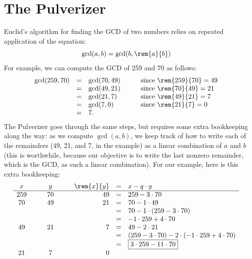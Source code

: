 \documentclass[handout]{mcs}
\begin{document}
\section{The Pulverizer}
Euclid's algorithm for finding the GCD of two numbers relies on
repeated application of the equation: 
\[
\gcd(a, b) = \gcd(b, \rem{a}{b})
\]
For example, we can compute the GCD of 259 and 70 as follows:
\[
\begin{array}{rclcl}
\gcd(259, 70)
    & = & \gcd(70, 49) & \quad & \text{since $\rem{259}{70} = 49$}\\
    & = & \gcd(49, 21) && \text{since $\rem{70}{49} = 21$} \\
    & = & \gcd(21, 7) && \text{since $\rem{49}{21} = 7$} \\
    & = & \gcd(7, 0) && \text{since $\rem{21}{7} = 0$} \\
    & = & 7.
\end{array}
\]
The Pulverizer goes through the same steps, but requires some extra
bookkeeping along the way: as we compute $\gcd(a, b)$, we keep track
of how to write each of the remainders (49, 21, and 7, in the example)
as a linear combination of $a$ and $b$ (this is worthwhile, because
our objective is to write the last nonzero remainder, which is the
GCD, as such a linear combination).  For our example, here is this
extra bookkeeping:
\[
\begin{array}{ccccrcl}
x & \quad & y & \quad & \rem{x}{y} & = & x - q \cdot y \\ \hline
259 && 70 && 49 & = &   259 - 3 \cdot 70 \\
70 && 49 && 21  & = &   70 - 1 \cdot 49 \\
&&&&            & = &   70 - 1 \cdot (259 - 3 \cdot 70) \\
&&&&            & = &   -1 \cdot 259 + 4 \cdot 70 \\
49 && 21 && 7   & = &   49 - 2 \cdot 21 \\
&&&&            & = &   (259 - 3 \cdot 70) -
                                2 \cdot (-1 \cdot 259 + 4 \cdot 70) \\
&&&&            & = &   \fbox{$3 \cdot 259 - 11 \cdot 70$} \\
21 && 7 && 0
\end{array}
\]
\end{document}
